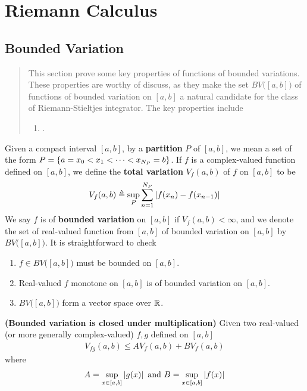 \documentclass{report}
\begin{document}
\chapter{Riemann Calculus}
\section{Bounded Variation}
\begin{abstract}
This section prove some key properties of functions of bounded variations. These properties are worthy of discuss, as they make the set $BV\big([a,b] \big)$ of functions of bounded variation on $[a,b]$ a natural candidate for the class of Riemann-Stieltjes integrator. The key properties include 
\begin{enumerate}[label=(\alph*)]
  \item {}.  
\end{enumerate}
\end{abstract}
\begin{mdframed}
 Given a compact interval $[a,b]$, by a \textbf{partition} $P$ of $[a,b]$, we mean a set of the form $P=\{ a=x_0<x_1 < \cdots  < x_{N_P} =b \}$. If $f$ is a complex-valued function defined on $[a,b]$, we define the \textbf{total variation} $V_f(a,b)$ of $f$ on  $[a,b]$ to be 
\begin{align*}
V_f(a,b)\triangleq \sup_P \sum_{n=1}^{N_P} \left|f(x_n)-f(x_{n-1})\right|
\end{align*}
We say $f$ is of \textbf{bounded variation} on $[a,b]$ if $V_f(a,b)<\infty$, and we denote the set of real-valued function from $[a,b]$ of bounded variation on $[a,b]$ by $BV\big([a,b] \big)$.  It is straightforward to check 
\begin{enumerate}[label=(\alph*)]
  \item  $f \in BV\big([a,b] \big)$ must be bounded on $[a,b]$. 
  \item Real-valued $f$ monotone on $[a,b]$ is of bounded variation on $[a,b]$. 
  \item $BV\big([a,b] \big)$ form a vector space over $\mathbb{R}$. 
\end{enumerate}
\end{mdframed}
\begin{theorem}
\textbf{(Bounded variation is closed under multiplication)} Given two real-valued (or more generally complex-valued) $f,g$  defined on $[a,b]$ 
\begin{align*}
V_{fg}(a,b)\leq AV_f(a,b)+BV_f(a,b)
\end{align*}
where 
\begin{align*}
A= \sup_{x \in [a,b]}\left|g(x)\right|\text{ and }B=\sup_{x\in [a,b]}\left|f(x)\right|
\end{align*}
\end{theorem}
\end{document}
